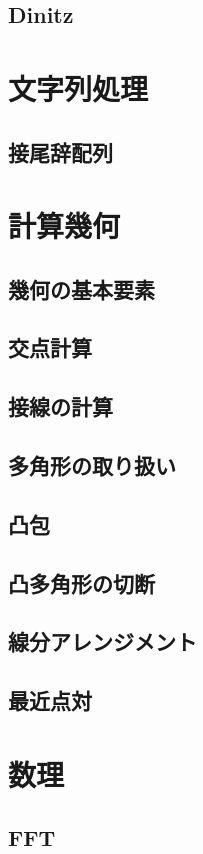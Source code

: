 \documentclass[landscape,twocolumn,9pt]{jsarticle}
\begin{document}
\subsection{Dinitz}


\section{文字列処理}

\subsection{接尾辞配列}


\section{計算幾何}

\subsection{幾何の基本要素}


\subsection{交点計算}


\subsection{接線の計算}


\subsection{多角形の取り扱い}


\subsection{凸包}


\subsection{凸多角形の切断}


\subsection{線分アレンジメント}


\subsection{最近点対}


\section{数理}

\subsection{FFT}

\end{document}
